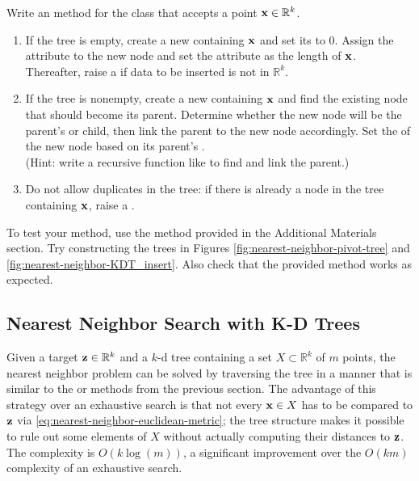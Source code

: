 \begin{problem} %
\label{prob:kdt-insert}
Write an  method for the  class that accepts a point $\mathbf{x}\in\mathbb{R}^k$.
\begin{enumerate}
\item If the tree is empty, create a new  containing $\mathbf{x}$ and set its  to $0$.
Assign the  attribute to the new node and set the  attribute as the length of $\mathbf{x}$.
Thereafter, raise a  if data to be inserted is not in $\mathbb{R}^k$.
\item If the tree is nonempty, create a new  containing $\mathbf{x}$ and find the existing node that should become its parent.
Determine whether the new node will be the parent's  or  child, then link the parent to the new node accordingly.
Set the  of the new node based on its parent's .
\\(Hint: write a recursive function like  to find and link the parent.)
\item Do not allow duplicates in the tree: if there is already a node in the tree containing $\mathbf{x}$, raise a .
\end{enumerate}
To test your method, use the  method provided in the Additional Materials section.
Try constructing the trees in Figures \ref{fig:nearest-neighbor-pivot-tree} and \ref{fig:nearest-neighbor-KDT_insert}.
Also check that the provided  method works as expected.
\end{problem}

\subsection*{Nearest Neighbor Search with K-D Trees} %

Given a target $\mathbf{z}\in\mathbb{R}^k$ and a $k$-d tree containing a set $X\subset\mathbb{R}^k$ of $m$ points, the nearest neighbor problem can be solved by traversing the tree in a manner that is similar to the  or  methods from the previous section.
The advantage of this strategy over an exhaustive search is that not every $\mathbf{x}\in X$ has to be compared to $\mathbf{z}$ via \eqref{eq:nearest-neighbor-euclidean-metric}; the tree structure makes it possible to rule out some elements of $X$ without actually computing their distances to $\mathbf{z}$.
The complexity is $O(k\log(m))$, a significant improvement over the $O(km)$ complexity of an exhaustive search.

